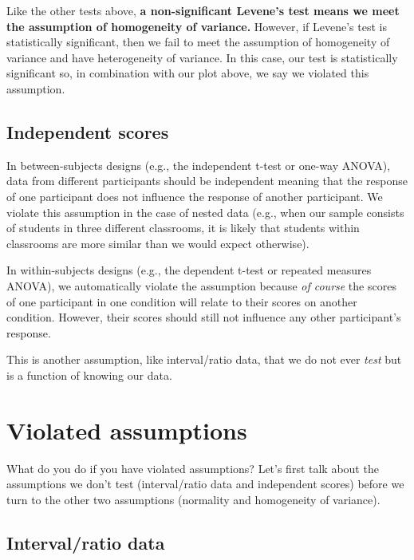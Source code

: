 \documentclass[
]{book}
\begin{document}
Like the other tests above, \textbf{a non-significant Levene's test means we meet the assumption of homogeneity of variance.} However, if Levene's test is statistically significant, then we fail to meet the assumption of homogeneity of variance and have heterogeneity of variance. In this case, our test is statistically significant so, in combination with our plot above, we say we violated this assumption.

\hypertarget{independent-scores}{%
\subsection{Independent scores}\label{independent-scores}}

In between-subjects designs (e.g., the independent t-test or one-way ANOVA), data from different participants should be independent meaning that the response of one participant does not influence the response of another participant. We violate this assumption in the case of nested data (e.g., when our sample consists of students in three different classrooms, it is likely that students within classrooms are more similar than we would expect otherwise).

In within-subjects designs (e.g., the dependent t-test or repeated measures ANOVA), we automatically violate the assumption because \emph{of course} the scores of one participant in one condition will relate to their scores on another condition. However, their scores should still not influence any other participant's response.

This is another assumption, like interval/ratio data, that we do not ever \emph{test} but is a function of knowing our data.

\hypertarget{violated-assumptions}{%
\section{Violated assumptions}\label{violated-assumptions}}

What do you do if you have violated assumptions? Let's first talk about the assumptions we don't test (interval/ratio data and independent scores) before we turn to the other two assumptions (normality and homogeneity of variance).

\hypertarget{intervalratio-data-1}{%
\subsection{Interval/ratio data}\label{intervalratio-data-1}}
\end{document}
